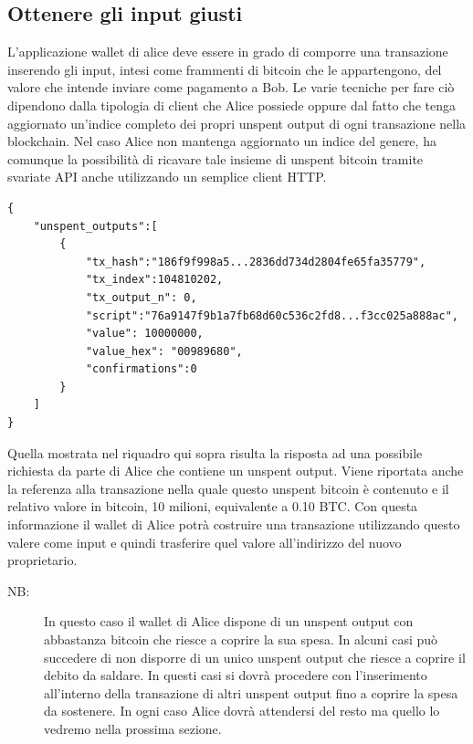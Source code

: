 \subsection*{Ottenere gli input giusti}
L'applicazione wallet di alice deve essere in grado di comporre una transazione inserendo gli input, intesi come frammenti di bitcoin che le appartengono, del valore che intende inviare come pagamento a Bob. Le varie tecniche per fare ciò dipendono dalla tipologia di client che Alice possiede oppure dal fatto che tenga aggiornato un'indice completo dei propri unspent output di ogni transazione nella blockchain. Nel caso Alice non mantenga aggiornato un indice del genere, ha comunque la possibilità di ricavare tale insieme di unspent bitcoin tramite svariate API anche utilizzando un semplice client HTTP. 
\begin{lstlisting}[numbers=none,frame=none]
{
	"unspent_outputs":[
		{
			"tx_hash":"186f9f998a5...2836dd734d2804fe65fa35779",
			"tx_index":104810202,
			"tx_output_n": 0,
			"script":"76a9147f9b1a7fb68d60c536c2fd8...f3cc025a888ac",
			"value": 10000000,
			"value_hex": "00989680",
			"confirmations":0
		}
	]
}
\end{lstlisting}
Quella mostrata nel riquadro qui sopra risulta la risposta ad una possibile richiesta da parte di Alice che contiene un unspent output. Viene riportata anche la referenza alla transazione nella quale questo unspent bitcoin è contenuto e il relativo valore in bitcoin, 10 milioni, equivalente a 0.10 BTC. Con questa informazione il wallet di Alice potrà costruire una transazione utilizzando questo valere come input e quindi trasferire quel valore all'indirizzo del nuovo proprietario.\\
\begin{description}
	\item[NB:] In questo caso il wallet di Alice dispone di un unspent output con abbastanza bitcoin che riesce a coprire la sua spesa. In alcuni casi può succedere di non disporre di un unico unspent output che riesce a coprire il debito da saldare. In questi casi si dovrà procedere con l'inserimento all'interno della transazione di altri unspent output fino a coprire la spesa da sostenere. In ogni caso Alice dovrà attendersi del resto ma quello lo vedremo nella prossima sezione.
\end{description}

